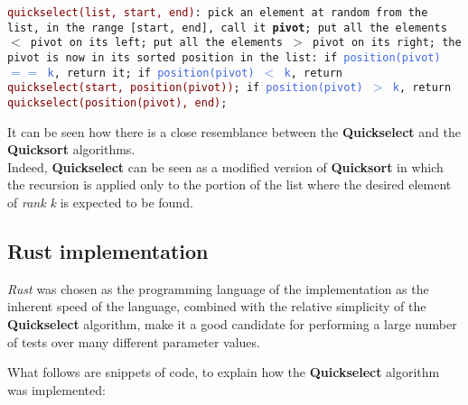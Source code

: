 \documentclass[
12pt,
a4paper,
oneside,
headinclude,
footinclude]{article}
\begin{document}
\texttt {\textcolor{Maroon}{quickselect(list, start, end)}: \newline
	\null\quad\quad pick an element at random from the list, \newline
    \null\quad\quad\quad\quad in the range [start, end], call it \textbf{pivot}; \newline
	\null\quad\quad put all the elements $<$ pivot on its left; \newline
	\null\quad\quad put all the elements $>$ pivot on its right; \newline
    \null\quad\quad the pivot is now in its sorted position in the list: \newline
    \null\quad\quad\quad\quad if \textcolor{RoyalBlue}{position(pivot) $==$ k}, return it; \newline
    \null\quad\quad\quad\quad if \textcolor{RoyalBlue}{position(pivot) $<$ k}, return \textcolor{Maroon}{quickselect(start, position(pivot))}; \newline
    \null\quad\quad\quad\quad if \textcolor{RoyalBlue}{position(pivot) $>$ k}, return \textcolor{Maroon}{quickselect(position(pivot), end)}; \newline}

It can be seen how there is a close resemblance between the \textbf{Quickselect} and the \textbf{Quicksort} algorithms. \\
Indeed, \textbf{Quickselect} can be seen as a modified version of \textbf{Quicksort} in which the recursion is applied only to the portion of the list where the desired element of \textit{rank k} is expected to be found.

\vspace{-5mm}
\subsection{Rust implementation}
\vspace{-5mm}
\textit{Rust} was chosen as the programming language of the implementation as the inherent speed of the language, combined with the relative simplicity of the \textbf{Quickselect} algorithm, make it a good candidate for performing a large number of tests over many different parameter values. 

What follows are snippets of code, to explain how the \textbf{Quickselect} algorithm was implemented:
\end{document}
